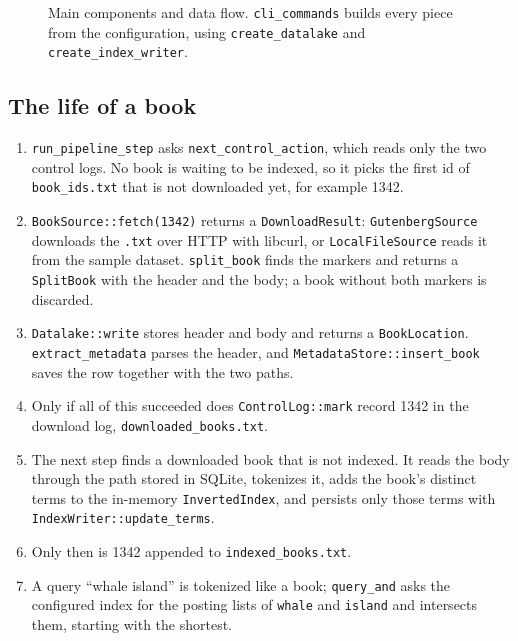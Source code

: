 \documentclass[11pt,a4paper]{article}
\newcommand{\code}[1]{\texttt{#1}}
\begin{document}
\begin{figure}[H]
\caption{Main components and data flow. \code{cli\_commands} builds every piece from the
configuration, using \code{create\_datalake} and \code{create\_index\_writer}.}
\label{fig:components}
\end{figure}

\subsection{The life of a book}
\begin{enumerate}
  \item \code{run\_pipeline\_step} asks \code{next\_control\_action}, which reads only the two control
        logs. No book is waiting to be indexed, so it picks the first id of \code{book\_ids.txt}
        that is not downloaded yet, for example 1342.
  \item \code{BookSource::fetch(1342)} returns a \code{DownloadResult}: \code{GutenbergSource}
        downloads the \code{.txt} over HTTP with libcurl, or \code{LocalFileSource} reads it from the
        sample dataset. \code{split\_book} finds the markers and returns a \code{SplitBook} with the
        header and the body; a book without both markers is discarded.
  \item \code{Datalake::write} stores header and body and returns a \code{BookLocation}.
        \code{extract\_metadata} parses the header, and \code{MetadataStore::insert\_book} saves the
        row together with the two paths.
  \item Only if all of this succeeded does \code{ControlLog::mark} record 1342 in the download log,
        \code{downloaded\_books.txt}.
  \item The next step finds a downloaded book that is not indexed. It reads the body through the path
        stored in SQLite, tokenizes it, adds the book's distinct terms to the in-memory
        \code{InvertedIndex}, and persists only those terms with \code{IndexWriter::update\_terms}.
  \item Only then is 1342 appended to \code{indexed\_books.txt}.
  \item A query ``whale island'' is tokenized like a book; \code{query\_and} asks the configured index
        for the posting lists of \code{whale} and \code{island} and intersects them, starting with the
        shortest.
\end{enumerate}
\end{document}
